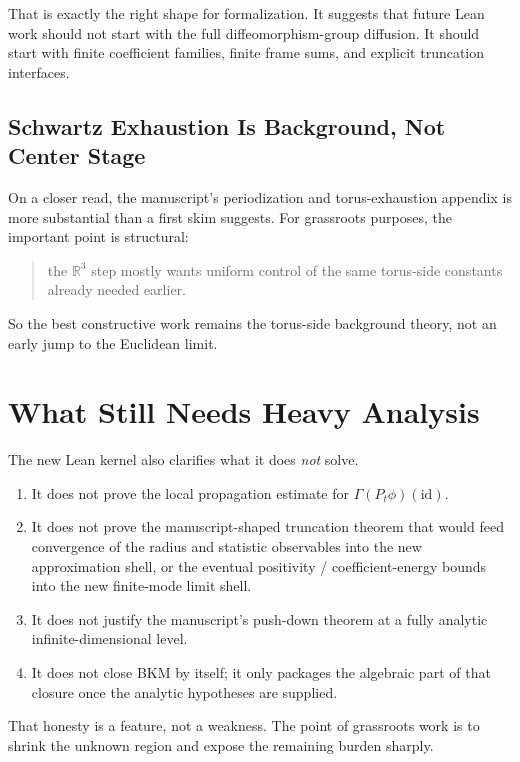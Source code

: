 \documentclass[11pt]{article}
\theoremstyle{remark}
\begin{document}
That is exactly the right shape for formalization.  It suggests that future Lean
work should not start with the full diffeomorphism-group diffusion.  It should
start with finite coefficient families, finite frame sums, and explicit
truncation interfaces.

\subsection{Schwartz Exhaustion Is Background, Not Center Stage}

On a closer read, the manuscript's periodization and torus-exhaustion appendix
is more substantial than a first skim suggests.  For grassroots purposes, the
important point is structural:
\begin{quote}
the \(\mathbb{R}^3\) step mostly wants uniform control of the same torus-side
constants already needed earlier.
\end{quote}

So the best constructive work remains the torus-side background theory, not an
early jump to the Euclidean limit.

\section{What Still Needs Heavy Analysis}

The new Lean kernel also clarifies what it does \emph{not} solve.

\begin{enumerate}[leftmargin=1.5em]
  \item It does not prove the local propagation estimate for
  \(\Gamma(P_t \phi)(\mathrm{id})\).
  \item It does not prove the manuscript-shaped truncation theorem that would
  feed convergence of the radius and statistic observables into the new
  approximation shell, or the eventual positivity / coefficient-energy bounds
  into the new finite-mode limit shell.
  \item It does not justify the manuscript's push-down theorem at a fully
  analytic infinite-dimensional level.
  \item It does not close BKM by itself; it only packages the algebraic part of
  that closure once the analytic hypotheses are supplied.
\end{enumerate}

That honesty is a feature, not a weakness.  The point of grassroots work is to
shrink the unknown region and expose the remaining burden sharply.
\end{document}
